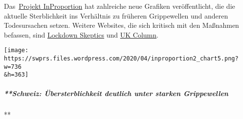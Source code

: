 Das~\href{http://inproportion2.talkigy.com/}{Projekt InProportion} hat
zahlreiche neue Grafiken veröffentlicht, die die aktuelle Sterblichkeit
ins Verhältnis zu früheren Grippewellen und anderen Todesursachen
setzen. Weitere Websites, die sich kritisch mit den Maßnahmen befassen,
sind \href{https://lockdownsceptics.org/}{Lockdown Skeptics} und
\href{https://www.ukcolumn.org/}{UK Column}.

\texttt{[image: https://swprs.files.wordpress.com/2020/04/inproportion2\_chart5.png?w=736\\\&h=363]}

\hypertarget{schweiz-uxfcbersterblichkeit-deutlich-unter-starken-grippewellen}{%
\subparagraph{**Schweiz: Übersterblichkeit deutlich unter starken
Grippewellen}\label{schweiz-uxfcbersterblichkeit-deutlich-unter-starken-grippewellen}}

**

